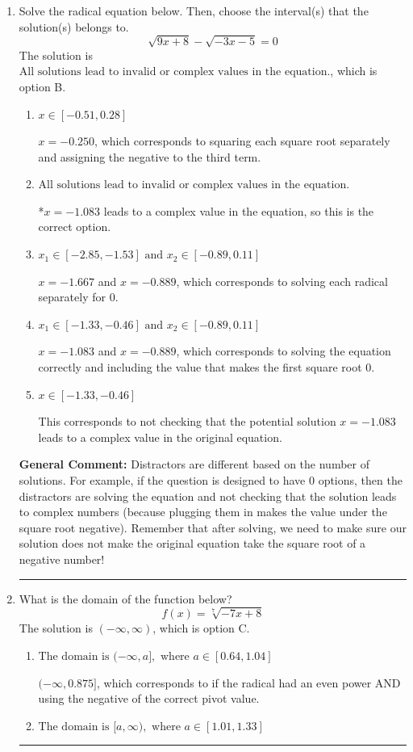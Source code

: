 \documentclass{extbook}[14pt]
\newcommand{\litem}[1]{\item #1

\rule{\textwidth}{0.4pt}}
\begin{document}
\begin{enumerate}\litem{
Solve the radical equation below. Then, choose the interval(s) that the solution(s) belongs to.
\[ \sqrt{9 x + 8} - \sqrt{-3 x - 5} = 0 \]The solution is \( \text{All solutions lead to invalid or complex values in the equation.} \), which is option B.\begin{enumerate}[label=\Alph*.]
\item \( x \in [-0.51,0.28] \)

$x = -0.250$, which corresponds to squaring each square root separately and assigning the negative to the third term.
\item \( \text{All solutions lead to invalid or complex values in the equation.} \)

*$x = -1.083$ leads to a complex value in the equation, so this is the correct option.
\item \( x_1 \in [-2.85, -1.53] \text{ and } x_2 \in [-0.89,0.11] \)

$x = -1.667$ and $x = -0.889$, which corresponds to solving each radical separately for 0.
\item \( x_1 \in [-1.33, -0.46] \text{ and } x_2 \in [-0.89,0.11] \)

$x = -1.083$ and $x = -0.889$, which corresponds to solving the equation correctly and including the value that makes the first square root 0.
\item \( x \in [-1.33,-0.46] \)

This corresponds to not checking that the potential solution $x = -1.083$ leads to a complex value in the original equation.
\end{enumerate}

\textbf{General Comment:} Distractors are different based on the number of solutions. For example, if the question is designed to have 0 options, then the distractors are solving the equation and not checking that the solution leads to complex numbers (because plugging them in makes the value under the square root negative). Remember that after solving, we need to make sure our solution does not make the original equation take the square root of a negative number!
}
\litem{
What is the domain of the function below?
\[ f(x) = \sqrt[7]{-7 x + 8} \]The solution is \( (-\infty, \infty) \), which is option C.\begin{enumerate}[label=\Alph*.]
\item \( \text{The domain is } (-\infty, a], \text{   where } a \in [0.64, 1.04] \)

$(-\infty, 0.875]$, which corresponds to if the radical had an even power AND using the negative of the correct pivot value.
\item \( \text{The domain is } [a, \infty), \text{   where } a \in [1.01, 1.33] \)


\end{enumerate}}
\end{enumerate}
\end{document}
